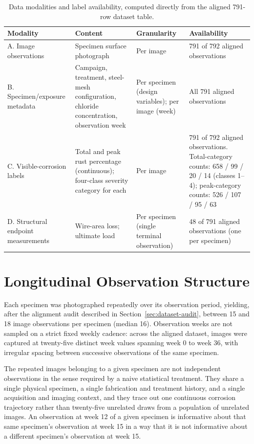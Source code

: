 \begin{table}[htbp]
\centering
\caption{Data modalities and label availability, computed directly from
the aligned 791-row dataset table.}
\label{tab:data-modalities}
\begin{tabular}{p{2.6cm}p{5.3cm}p{2.0cm}p{3.4cm}}
\toprule
Modality & Content & Granularity & Availability \\
\midrule
A. Image observations & Specimen surface photograph & Per image & 791 of
792 aligned observations \\
B. Specimen/exposure metadata & Campaign, treatment, steel-mesh
configuration, chloride concentration, observation week & Per specimen
(design variables); per image (week) & All 791 aligned observations \\
C. Visible-corrosion labels & Total and peak rust percentage (continuous);
four-class severity category for each & Per image & 791 of 792 aligned
observations. Total-category counts: 658 / 99 / 20 / 14 (classes 1--4);
peak-category counts: 526 / 107 / 95 / 63 \\
D. Structural endpoint measurements & Wire-area loss; ultimate load & Per
specimen (single terminal observation) & 48 of 791 aligned observations
(one per specimen) \\
\bottomrule
\end{tabular}
\end{table}

\section{Longitudinal Observation Structure}
\label{sec:longitudinal}

Each specimen was photographed repeatedly over its observation period,
yielding, after the alignment audit described in
Section~\ref{sec:dataset-audit}, between 15 and 18 image observations per
specimen (median 16). Observation weeks are not sampled on a strict fixed
weekly cadence: across the aligned dataset, images were captured at
twenty-five distinct week values spanning week 0 to week 36, with
irregular spacing between successive observations of the same specimen.

The repeated images belonging to a given specimen are not independent
observations in the sense required by a naive statistical treatment. They
share a single physical specimen, a single fabrication and treatment
history, and a single acquisition and imaging context, and they trace out
one continuous corrosion trajectory rather than twenty-five unrelated
draws from a population of unrelated images. An observation at week 12 of
a given specimen is informative about that same specimen's observation at
week 15 in a way that it is not informative about a different specimen's
observation at week 15.

